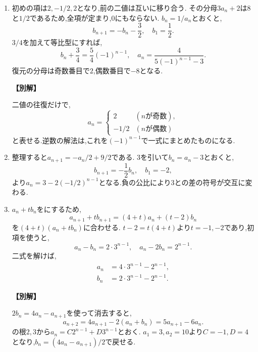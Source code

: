 \begin{enumerate}[label=\textbf{問\arabic*.},leftmargin=3.8em,format=\bookitemlink{practice-basic}{solution}{problem}]
          \item 初めの項は$2,-1/2,2$となり,前の二値は互いに移り合う.
                  その分母$3a_n+2$は$8$と$1/2$であるため,全項が定まり,$0$にもならない.
                  $b_n=1/a_n$とおくと,
                  \[
                    b_{n+1}=-b_n-\frac32,\quad b_1=\frac12.
                  \]
                  $3/4$を加えて等比型にすれば,
                  \[
                    b_n+\frac34=\frac54(-1)^{n-1},\quad
                    a_n=\frac4{5(-1)^{n-1}-3}.
                  \]
                  復元の分母は奇数番目で$2$,偶数番目で$-8$となる.
                  \par\smallskip\noindent\textbf{【別解】}\par
                  二値の往復だけで,
                  \[
                    a_n=\begin{cases}
                      2&(n\text{が奇数}),\\
                      -1/2&(n\text{が偶数})
                    \end{cases}
                  \]
                  と表せる.逆数の解法は,これを$(-1)^{n-1}$で一式にまとめたものになる.

          \item 整理すると$a_{n+1}=-a_n/2+9/2$である.
                  $3$を引いて$b_n=a_n-3$とおくと,
                  \[
                    b_{n+1}=-\frac12b_n,\quad b_1=-2,
                  \]
                  より$a_n=3-2(-1/2)^{n-1}$となる.負の公比により$3$との差の符号が交互に変わる.

          \item $a_n+t b_n$をにするため,
                  \[
                    a_{n+1}+t b_{n+1}=(4+t)a_n+(t-2)b_n
                  \]
                  を$(4+t)(a_n+t b_n)$に合わせる.
                  $t-2=t(4+t)$より$t=-1,-2$であり,初項を使うと,
                  \[
                    a_n-b_n=2\cdot3^{n-1},\quad a_n-2b_n=2^{n-1}.
                  \]
                  二式を解けば,
                  \[
                    \begin{aligned}
                    a_n&=4\cdot3^{n-1}-2^{n-1},\\
                    b_n&=2\cdot3^{n-1}-2^{n-1}.
                    \end{aligned}
                  \]
                  \par\smallskip\noindent\textbf{【別解】}\par
                  $2b_n=4a_n-a_{n+1}$を使って消去すると,
                  \[
                    a_{n+2}=4a_{n+1}-2(a_n+b_n)=5a_{n+1}-6a_n.
                  \]
                  の根$2,3$から$a_n=C2^{n-1}+D3^{n-1}$とおく.
                  $a_1=3,a_2=10$より$C=-1,D=4$となり,$b_n=(4a_n-a_{n+1})/2$で戻せる.


\end{enumerate}
